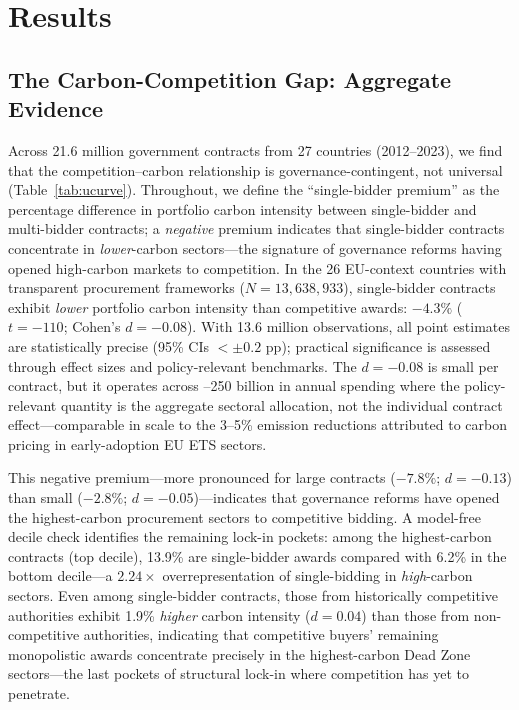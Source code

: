 \documentclass[11pt,a4paper]{article}
\begin{document}
\section{Results}

\subsection{The Carbon-Competition Gap: Aggregate Evidence}

Across 21.6 million government contracts from 27 countries (2012--2023), we find that the competition--carbon relationship is governance-contingent, not universal (Table~\ref{tab:ucurve}). Throughout, we define the ``single-bidder premium'' as the percentage difference in portfolio carbon intensity between single-bidder and multi-bidder contracts; a \textit{negative} premium indicates that single-bidder contracts concentrate in \textit{lower}-carbon sectors---the signature of governance reforms having opened high-carbon markets to competition. In the 26 EU-context countries with transparent procurement frameworks ($N = 13{,}638{,}933$), single-bidder contracts exhibit \textit{lower} portfolio carbon intensity than competitive awards: $-4.3\%$ ($t = -110$; Cohen's $d = -0.08$). With 13.6 million observations, all point estimates are statistically precise (95\% CIs $<\pm0.2$ pp); practical significance is assessed through effect sizes and policy-relevant benchmarks. The $d = -0.08$ is small per contract, but it operates across --250 billion in annual spending where the policy-relevant quantity is the aggregate sectoral allocation, not the individual contract effect---comparable in scale to the 3--5\% emission reductions attributed to carbon pricing in early-adoption EU ETS sectors\cite{herre2023emission}.

This negative premium---more pronounced for large contracts ($-7.8\%$; $d = -0.13$) than small ($-2.8\%$; $d = -0.05$)---indicates that governance reforms have opened the highest-carbon procurement sectors to competitive bidding. A model-free decile check identifies the remaining lock-in pockets: among the highest-carbon contracts (top decile), 13.9\% are single-bidder awards compared with 6.2\% in the bottom decile---a $2.24\times$ overrepresentation of single-bidding in \textit{high}-carbon sectors. Even among single-bidder contracts, those from historically competitive authorities exhibit 1.9\% \textit{higher} carbon intensity ($d = 0.04$) than those from non-competitive authorities, indicating that competitive buyers' remaining monopolistic awards concentrate precisely in the highest-carbon Dead Zone sectors---the last pockets of structural lock-in where competition has yet to penetrate.
\end{document}
